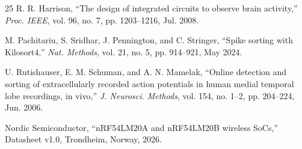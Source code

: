 \documentclass[11pt]{article}
\begin{document}
\begin{thebibliography}{25}
 R. R. Harrison, ``The design of integrated circuits to observe brain activity,'' \emph{Proc. IEEE}, vol. 96, no. 7, pp. 1203--1216, Jul. 2008.

 M. Pachitariu, S. Sridhar, J. Pennington, and C. Stringer, ``Spike sorting with Kilosort4,'' \emph{Nat. Methods}, vol. 21, no. 5, pp. 914--921, May 2024.

 U. Rutishauser, E. M. Schuman, and A. N. Mamelak, ``Online detection and sorting of extracellularly recorded action potentials in human medial temporal lobe recordings, in vivo,'' \emph{J. Neurosci. Methods}, vol. 154, no. 1--2, pp. 204--224, Jun. 2006.

 Nordic Semiconductor, ``nRF54LM20A and nRF54LM20B wireless SoCs,'' Datasheet v1.0, Trondheim, Norway, 2026.

\end{thebibliography}
\end{document}
